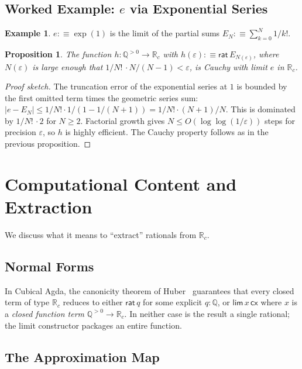 \documentclass[12pt]{article}
\newtheorem{proposition}[theorem]{Proposition}
\theoremstyle{definition}
\newtheorem{example}[theorem]{Example}
\theoremstyle{remark}
\newcommand{\Q}{\mathbb{Q}}
\newcommand{\Rc}{\mathbb{R}_{c}}
\newcommand{\rat}{\mathsf{rat}}
\newcommand{\hlim}{\mathsf{lim}}
\begin{document}
\subsection{Worked Example: $e$ via Exponential Series}

\begin{example}
\label{ex:e-series}
$e :\equiv \exp(1)$ is the limit of the partial sums
$E_N :\equiv \sum_{k=0}^{N} 1/k!$.
\end{example}

\begin{proposition}
The function $h : \Q^{>0} \to \Rc$ with
$h(\varepsilon) :\equiv \rat\,E_{N(\varepsilon)}$, where
$N(\varepsilon)$ is large enough that $1/N!\, \cdot N/(N-1) < \varepsilon$,
is Cauchy with limit $e$ in $\Rc$.
\end{proposition}
\begin{proof}[Proof sketch]
The truncation error of the exponential series at $1$ is bounded by
the first omitted term times the geometric series sum:
$|e - E_N| \leq 1/N! \cdot 1/(1 - 1/(N+1)) = 1/N! \cdot (N+1)/N$.
This is dominated by $1/N!\, \cdot 2$ for $N \geq 2$. Factorial growth
gives $N \leq O(\log\log(1/\varepsilon))$ steps for precision
$\varepsilon$, so $h$ is highly efficient. The Cauchy property follows
as in the previous proposition.
\end{proof}

\section{Computational Content and Extraction}
\label{sec:extraction}

We discuss what it means to ``extract'' rationals from $\Rc$.

\subsection{Normal Forms}

In Cubical Agda, the canonicity theorem of Huber~\cite{Huber} guarantees
that every closed term of type $\Rc$ reduces to either $\rat\,q$ for
some explicit $q : \Q$, or $\hlim\,x\,\mathsf{cx}$ where $x$ is a
\emph{closed function term} $\Q^{>0} \to \Rc$. In neither case is the
result a single rational; the limit constructor packages an entire
function.

\subsection{The Approximation Map}
\end{document}
